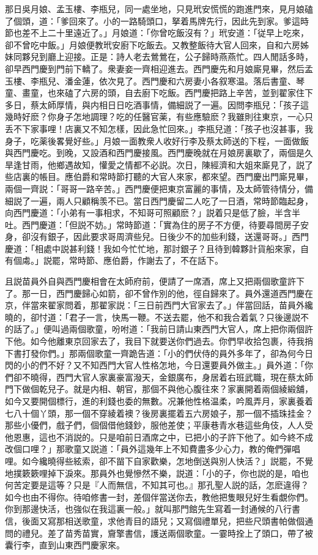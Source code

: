 那日吳月娘、孟玉樓、李瓶兒，同一處坐地，只見玳安慌慌的跑進門來，見月娘磕了個頭，道：「爹回來了。小的一路騎頭口，拏着馬牌先行，因此先到家。爹這時節也差不上二十里遠近了。」月娘道：「你曾吃飯沒有？」玳安道：「従早上吃來，卻不曾吃中飯。」月娘便教玳安廚下吃飯去。又教整飯待大官人回來，自和六房姊妹同夥兒到廳上迎接。正是：詩人老去鶯鶯在，公子歸時燕燕忙。四人閒話多時，卻早西門慶到門前下轎了。衆妻妾一齊相迎進去。西門慶先和月娘廝見畢，然后孟玉樓、李瓶兒、潘金蓮，依次見了。西門慶和六房妻小各叙寒温。落后書童、琴童、畫童，也來磕了六房的頭，自去廚下吃飯。西門慶把路上辛苦，並到翟家住下多日，蔡太師厚情，與内相日日吃酒事情，備細説了一遍。因問李瓶兒：「孩子這幾時好麽？你身子怎地調理？吃的任醫官薬，有些應驗麽？我雖則往東京，一心只丢不下家事哩！店裏又不知怎樣，因此急忙回來。」李瓶兒道：「孩子也沒甚事，我身子，吃薬後畧覺好些。」月娘一面教衆人收好行李及蔡太師送的下程，一面做飯與西門慶吃。到晚，又設酒和西門慶接風。西門慶晚就在月娘房裏歇了，兩個是久旱逢甘雨，他鄉遇故知，懽愛之情都不必説。次日，陳經濟和大姐來廝見了，説了些店裏的帳目。應伯爵和常時節打聽的大官人來家，都來望。西門慶出門廝見畢，兩個一齊説：「哥哥一路辛苦。」西門慶便把東京富麗的事情，及太師管待情分，備細説了一遍，兩人只顧稱羡不已。當日西門慶留二人吃了一日酒，常時節臨起身，向西門慶道：「小弟有一事相求，不知哥可照顧麽？」説着只是低了臉，半含半吐。西門慶道：「但説不妨。」常時節道：「實為住的房子不方便，待要尋間房子安身，卻沒有銀子，因此要求哥周濟些兒。日後少不的加些利錢，送還哥哥。」西門慶道：「相處中説甚利錢！我如今忙忙地，那討銀子？且待到韓夥計貨船來家，自有個䖏。」説罷，常時節、應伯爵，作謝去了，不在話下。

且説苗員外自與西門慶相會在太師府前，便請了一席酒，席上又把兩個歌童許下了。那一日，西門慶歸心如箭，卻不曾作別的他，徑自歸來了。員外還道西門慶在京，伴當來翟家問着，那翟家説：「三日前西門大官家去了。」伴當回話，苗員外纔曉的，卻忖道：「君子一言，快馬一鞭。不送去罷，他不和我合着氣？只後邊説不的話了。」便叫過兩個歌童，吩咐道：「我前日請山東西門大官人，席上把你兩個許下他。如今他離東京回家去了，我目下就要送你們過去。你們早收拾包裹，待我捎下書打發你們。」那兩個歌童一齊跪告道：「小的們伏侍的員外多年了，卻為何今日閃的小的們不好？又不知西門大官人性格怎地，今日還要員外做主。」員外道：「你們卻不曉得，西門大官人家裏豪富潑天，金銀廣布，身居着右班武職，現在蔡太師門下做個乾兒子。就是内相、朝官，那個不與他心腹往來？家裏開着兩個綾緞舖，如今又要開個標行，進的利錢也委的無數。况兼他性格温柔，吟風弄月，家裏養着七八十個丫頭，那一個不穿綾着襖？後房裏擺着五六房娘子，那一個不插珠挂金？那些小優們，戲子們，個個借他錢鈔，服他差使；平康巷青水巷這些角伎，人人受他恩惠，這也不消説的。只是咱前日酒席之中，已把小的子許下他了。如今終不成改個口哩？」那歌童又説道：「員外這幾年上不知費盡多少心力，教的俺們彈唱哩。如今纔曉得些絃索，卻不㽞下自家歡樂，怎地倒送與別人快活？」説罷，不覺地撲簌簌哩掉下淚來。那員外也覺慘然不樂，説道：「小的子，你也説的是，咱也何苦定要是這等？只是『人而無信，不知其可也。』那孔聖人説的話，怎麽違得？如今也由不得你。待咱修書一封，差個伴當送你去，教他把隻眼兒好生看覷你們。你到那邊快活，也強似在我這裏一般。」就叫那門館先生寫着一封通候的八行書信，後面又寫那相送歌童，求他青目的語兒；又寫個禮單兒，把些尺頭書帕做個通問的禮兒。差了苗秀苗實，齎擎書信，護送兩個歌童。一霎時拴上了頭口，帶了被囊行李，直到山東西門慶家來。


